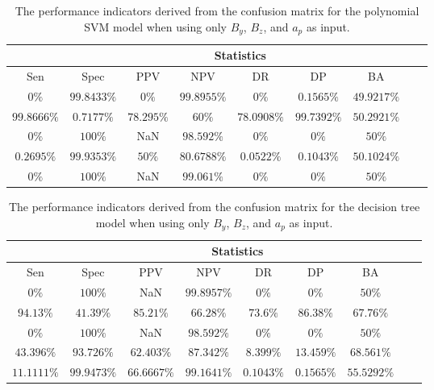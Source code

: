 \begin{table}[!ht]
	\centering
	\begin{tabular}{|c|c|c|c|c|c|c|c|c|}
		\hline
		 & \multicolumn{7}{c|}{Statistics} \\ \hline
		Sen & Spec & PPV & NPV & DR & DP & BA \\ \hline
		$0\%$ & $99.8433\%$ & $0\%$ & $99.8955\%$ & $0\%$ & $0.1565\%$ & $49.9217\%$ \\ \hline
		$99.8666\%$ & $0.7177\%$ & $78.295\%$ & $60\%$ & $78.0908\%$ & $99.7392\%$ & $50.2921\%$ \\ \hline
		$0\%$ & $100\%$ & NaN & $98.592\%$ & $0\%$ & $0\%$ & $50\%$ \\ \hline
		$0.2695\%$ & $99.9353\%$ & $50\%$ & $80.6788\%$ & $0.0522\%$ & $0.1043\%$ & $50.1024\%$ \\ \hline
		$0\%$ & $100\%$ & NaN & $99.061\%$ & $0\%$ & $0\%$ & $50\%$ \\ \hline
	\end{tabular}
	\caption{The performance indicators derived from the confusion matrix for the polynomial SVM model when using only $B_{y}$, $B_{z}$, and $a_{p}$ as input.}
	\label{tab:cs:yzap:svmPoly}
\end{table}

\begin{table}[!ht]
	\centering
	\begin{tabular}{|c|c|c|c|c|c|c|c|c|}
		\hline
		 & \multicolumn{7}{c|}{Statistics} \\ \hline
		Sen & Spec & PPV & NPV & DR & DP & BA \\ \hline
		$0\%$ & $100\%$ & NaN & $99.8957\%$ & $0\%$ & $0\%$ & $50\%$ \\ \hline
		$94.13\%$ & $41.39\%$ & $85.21\%$ & $66.28\%$ & $73.6\%$ & $86.38\%$ & $67.76\%$ \\ \hline
		$0\%$ & $100\%$ & NaN & $98.592\%$ & $0\%$ & $0\%$ & $50\%$ \\ \hline
		$43.396\%$ & $93.726\%$ & $62.403\%$ & $87.342\%$ & $8.399\%$ & $13.459\%$ & $68.561\%$ \\ \hline
		$11.1111\%$ & $99.9473\%$ & $66.6667\%$ & $99.1641\%$ & $0.1043\%$ & $0.1565\%$ & $55.5292\%$ \\ \hline
	\end{tabular}
	\caption{The performance indicators derived from the confusion matrix for the decision tree model when using only $B_{y}$, $B_{z}$, and $a_{p}$ as input.}
	\label{tab:cs:yzap:C5.0}
\end{table}

